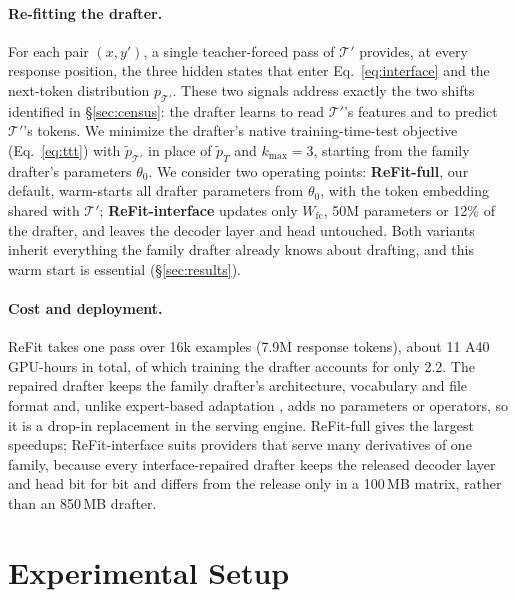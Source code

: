 \documentclass[11pt]{article}
\newcommand{\Tp}{\mathcal{T}'}
\newcommand{\refit}{ReFit}
\newcommand{\refitI}{ReFit-interface}
\newcommand{\refitF}{ReFit-full}
\begin{document}
\paragraph{Re-fitting the drafter.}
For each pair $(x, y')$, a single teacher-forced pass of $\Tp$ provides, at every response position, the three hidden states that enter Eq.~\eqref{eq:interface} and the next-token distribution $p_{\Tp}$.
These two signals address exactly the two shifts identified in \S\ref{sec:census}: the drafter learns to read $\Tp$'s features and to predict $\Tp$'s tokens.
We minimize the drafter's native training-time-test objective (Eq.~\ref{eq:ttt}) with $\tilde p_{\Tp}$ in place of $\tilde p_T$ and $k_{\max} = 3$, starting from the family drafter's parameters $\theta_0$.
We consider two operating points: \textbf{\refitF{}}, our default, warm-starts all drafter parameters from $\theta_0$, with the token embedding shared with $\Tp$; \textbf{\refitI{}} updates only $W_{\text{fc}}$, 50M parameters or 12\% of the drafter, and leaves the decoder layer and head untouched.
Both variants inherit everything the family drafter already knows about drafting, and this warm start is essential (\S\ref{sec:results}).

\paragraph{Cost and deployment.}
\refit{} takes one pass over 16k examples (7.9M response tokens), about 11 A40 GPU-hours in total, of which training the drafter accounts for only 2.2.
The repaired drafter keeps the family drafter's architecture, vocabulary and file format and, unlike expert-based adaptation \citep{lin2026eda}, adds no parameters or operators, so it is a drop-in replacement in the serving engine.
\refitF{} gives the largest speedups; \refitI{} suits providers that serve many derivatives of one family, because every interface-repaired drafter keeps the released decoder layer and head bit for bit and differs from the release only in a 100\,MB matrix, rather than an 850\,MB drafter.

\section{Experimental Setup}
\label{sec:setup}
\end{document}
